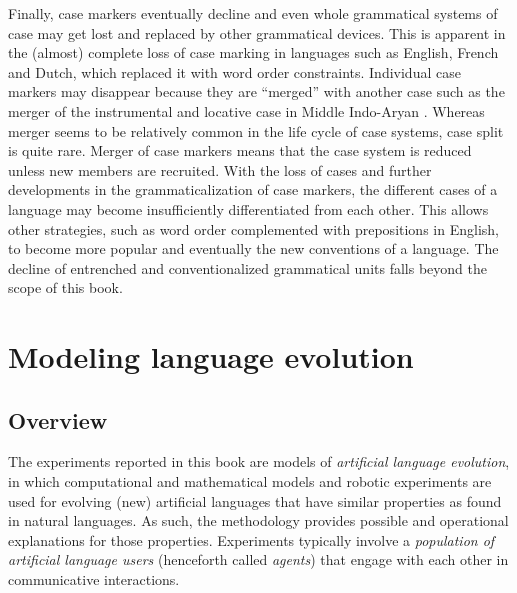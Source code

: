 Finally, case markers eventually decline and even whole grammatical systems of case may get lost and replaced by other grammatical devices. This is apparent in the (almost) complete loss of case marking in languages such as English, French and Dutch, which replaced it with word order constraints. Individual case markers may disappear because they are ``merged'' with another case such as the merger of the instrumental and locative case in Middle Indo-Aryan \citep[176]{blake94case}. Whereas merger seems to be relatively common in the life cycle of case systems, case split is quite rare. Merger of case markers means that the case system is reduced unless new members are recruited. With the loss of cases and further developments in the grammaticalization of case markers, the different cases of a language may become insufficiently differentiated from each other. This allows other strategies, such as word order complemented with prepositions in English, to become more popular and eventually the new conventions of a language. The decline of entrenched and conventionalized grammatical units falls beyond the scope of this book.

\section{Modeling language evolution}
\label{s:models}

\subsection{Overview}
The experiments reported in this book are models of {\em artificial language evolution}, in which computational and mathematical models and robotic experiments are used for evolving (new) artificial languages that have similar properties as found in natural languages. As such, the methodology provides possible and operational explanations for those properties. Experiments typically involve a {\em population of artificial language users} (henceforth called {\em agents}) that engage with each other in communicative interactions. 

